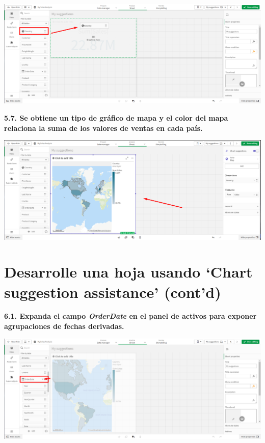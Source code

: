 \documentclass{article}
\begin{document}
    \begin{center}
		\includegraphics[width=14cm]{./images/18} 
	\end{center}
\newpage
\textbf{5.7. Se obtiene un tipo de
 gráfico de mapa y el color del mapa relaciona la suma de los valores de ventas en cada país.}

    \begin{center}
		\includegraphics[width=14cm]{./images/18.1} 
	\end{center}


\newpage
\section{Desarrolle una hoja usando ‘Chart suggestion assistance’ (cont’d)}

\textbf{6.1. Expanda el campo \textit{OrderDate} en el panel de 
activos para exponer agrupaciones de fechas derivadas.}

    \begin{center}
		\includegraphics[width=14cm]{./images/19} 
	\end{center}
\end{document}
